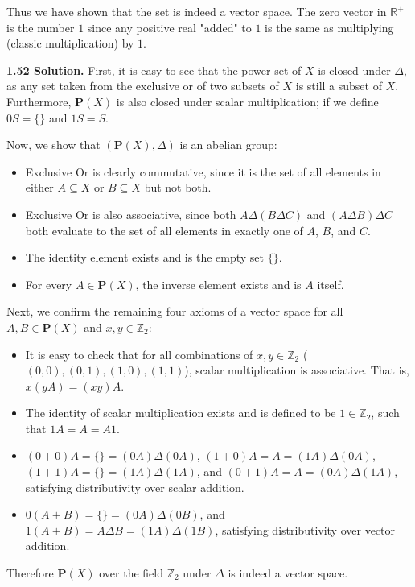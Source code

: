 Thus we have shown that the set is indeed a vector space. The zero vector in $\mathbb{R}^+$ is the number $1$ since any positive real "added" to $1$ is the same as multiplying (classic multiplication) by $1$.

\textbf{1.52 Solution.} First, it is easy to see that the power set of $X$ is closed under $\Delta$, as any set taken from the exclusive or of two subsets of $X$ is still a subset of $X$. Furthermore, $\textbf{P}(X)$ is also closed under scalar multiplication; if we define $0S=\{\}$ and $1S=S$.

Now, we show that $(\textbf{P}(X),\Delta)$ is an abelian group:
\begin{itemize}
    \setlength{\parskip}{0pt}
    \item Exclusive Or is clearly commutative, since it is the set of all elements in either $A\subseteq X$ or $B\subseteq X$ but not both.
    \item Exclusive Or is also associative, since both $A\Delta(B\Delta C)$ and $(A\Delta B)\Delta C$ both evaluate to the set of all elements in exactly one of $A$, $B$, and $C$.
    \item The identity element exists and is the empty set $\{\}$.
    \item For every $A\in\textbf{P}(X)$, the inverse element exists and is $A$ itself.
\end{itemize}

Next, we confirm the remaining four axioms of a vector space for all $A,B\in\textbf{P}(X)$ and $x,y\in\mathbb{Z}_2$:
\begin{itemize}
    \setlength{\parskip}{0pt}
    \item It is easy to check that for all combinations of $x,y\in\mathbb{Z}_2$ ($(0,0),(0,1),(1,0),(1,1)$), scalar multiplication is associative. That is, $x(yA) = (xy)A$.
    \item The identity of scalar multiplication exists and is defined to be $1\in\mathbb{Z}_2$, such that $1A=A=A1$.
    \item $(0+0)A = \{\} = (0A)\Delta(0A)$, $(1+0)A = A = (1A)\Delta(0A)$, $(1+1)A = \{\} = (1A)\Delta(1A)$, and $(0+1)A = A = (0A)\Delta(1A)$, satisfying distributivity over scalar addition.
    \item $0(A+B) = \{\} = (0A)\Delta(0B)$, and $1(A+B) = A\Delta B = (1A)\Delta(1B)$, satisfying distributivity over vector addition.
\end{itemize}
Therefore $\textbf{P}(X)$ over the field $\mathbb{Z}_2$ under $\Delta$ is indeed a vector space.

